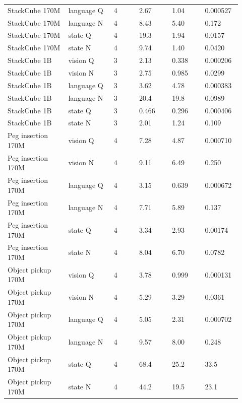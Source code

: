 \begin{longtable}{p{0.240\linewidth} p{0.180\linewidth} p{0.100\linewidth} p{0.130\linewidth} p{0.130\linewidth} p{0.140\linewidth}}
StackCube 170M & language Q & 4 & 2.67 & 1.04 & 0.000527 \\
StackCube 170M & language N & 4 & 8.43 & 5.40 & 0.172 \\
StackCube 170M & state Q & 4 & 19.3 & 1.94 & 0.0157 \\
StackCube 170M & state N & 4 & 9.74 & 1.40 & 0.0420 \\
StackCube 1B & vision Q & 3 & 2.13 & 0.338 & 0.000206 \\
StackCube 1B & vision N & 3 & 2.75 & 0.985 & 0.0299 \\
StackCube 1B & language Q & 3 & 3.62 & 4.78 & 0.000383 \\
StackCube 1B & language N & 3 & 20.4 & 19.8 & 0.0989 \\
StackCube 1B & state Q & 3 & 0.466 & 0.296 & 0.000406 \\
StackCube 1B & state N & 3 & 2.01 & 1.24 & 0.109 \\
Peg insertion 170M & vision Q & 4 & 7.28 & 4.87 & 0.000710 \\
Peg insertion 170M & vision N & 4 & 9.11 & 6.49 & 0.250 \\
Peg insertion 170M & language Q & 4 & 3.15 & 0.639 & 0.000672 \\
Peg insertion 170M & language N & 4 & 7.71 & 5.89 & 0.137 \\
Peg insertion 170M & state Q & 4 & 3.34 & 2.93 & 0.00174 \\
Peg insertion 170M & state N & 4 & 8.04 & 6.70 & 0.0782 \\
Object pickup 170M & vision Q & 4 & 3.78 & 0.999 & 0.000131 \\
Object pickup 170M & vision N & 4 & 5.29 & 3.29 & 0.0361 \\
Object pickup 170M & language Q & 4 & 5.05 & 2.31 & 0.000702 \\
Object pickup 170M & language N & 4 & 9.57 & 8.00 & 0.248 \\
Object pickup 170M & state Q & 4 & 68.4 & 25.2 & 33.5 \\
Object pickup 170M & state N & 4 & 44.2 & 19.5 & 23.1 \\
\end{longtable}

